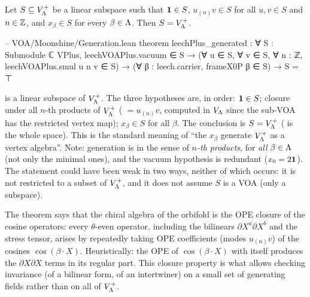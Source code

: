 \begin{theorem}[Generation]\label{ch04:thm:gen}
Let $S\subseteq V_{\Lambda}^+$ be a linear subspace such that $\mathbf{1}\in S$, $u_{(n)}v\in S$ for all
$u,v\in S$ and $n\in{\mathbb{Z}}$, and $x_\beta\in S$ for every $\beta\in{\Lambda}$. Then $S=V_{\Lambda}^+$.
\end{theorem}

\begin{leancode}
-- VOA/Moonshine/Generation.lean
theorem leechPlus_generated : ∀ S : Submodule ℂ VPlus, leechVOAPlus.vacuum ∈ S →
    (∀ u ∈ S, ∀ v ∈ S, ∀ n : ℤ, leechVOAPlus.smul u n v ∈ S) →
    (∀ β : leech.carrier, frameX0P β ∈ S) → S = ⊤
\end{leancode}

\begin{dictionary}
 is a linear subspace of $V_{\Lambda}^+$. The three hypotheses are, in
order: $\mathbf{1}\in S$; closure under all $n$-th products of $V_{\Lambda}^+$ (
$=u_{(n)}v$, computed in $V_{\Lambda}$ since the sub-VOA has the restricted vertex map);
$x_\beta\in S$ for all $\beta$. The conclusion  is $S=V_{\Lambda}^+$ ( is the whole
space). This is the standard meaning of ``the $x_\beta$ generate $V_{\Lambda}^+$ as a vertex algebra''.
Note: generation is in the sense of \emph{$n$-th products}, for \emph{all} $\beta\in{\Lambda}$ (not only
the minimal ones), and the vacuum hypothesis is redundant ($x_0=2\mathbf{1}$). The statement could
have been weak in two ways, neither of which occurs: it is not restricted to a subset of
$V_{\Lambda}^+$, and it does not assume $S$ is a VOA (only a subspace).
\end{dictionary}

\begin{physics}
The theorem says that the chiral algebra of the orbifold is the OPE closure of the cosine operators: every $\theta$-even operator, including the bilinears $\partial X^a\partial X^b$ and the stress tensor, arises by repeatedly taking OPE coefficients (modes $u_{(n)}v$) of the cosines $\cos(\beta\cdot X)$. Heuristically: the OPE of $\cos(\beta\cdot X)$ with itself produces the $\partial X\partial X$ terms in its regular part. This closure property is what allows checking invariance (of a bilinear form, of an intertwiner) on a small set of generating fields rather than on all of $V_{\Lambda}^+$.
\end{physics}

